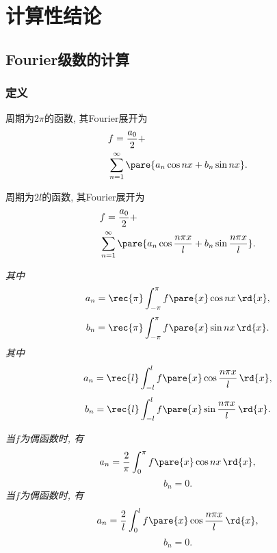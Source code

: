 \documentclass[hidelinks]{ctexart}
\begin{document}



\section{计算性结论} %
\label{sec:计算性结论}

\subsection{Fourier级数的计算} %
\label{sub:fourier级数的计算}

\subsubsection{定义} %
\label{ssub:定义}

\begin{finale}

\begin{multicols}{2}
    \begin{theorem}
        周期为$2\pi$的函数, 其Fourier展开为
        \begin{align*}
            &f = \frac{a_0}{2} +\\
            &\sum_{n=1}^\infty \pare{a_n\cos nx + b_n\sin nx}.
        \end{align*}
    \end{theorem}
    \begin{theorem}
        周期为$2l$的函数, 其Fourier展开为
        \begin{align*}
            &f = \frac{a_0}{2} +\\
            &\sum_{n=1}^\infty \pare{a_n\cos \frac{n\pi x}{l} + b_n\sin \frac{n\pi x}{l}}.
        \end{align*}
    \end{theorem}
\end{multicols}

\end{finale}
\begin{finale}
\begin{multicols}{2}
    \textit{其中}
    \[ a_n = \rec{\pi} \int_{-\pi}^{\pi} f\pare{x}\cos nx\,\rd{x},\]
    \[ b_n = \rec{\pi} \int_{-\pi}^\pi f\pare{x}\sin nx\,\rd{x}. \]
    \textit{其中}
    \[ a_n = \rec{l} \int_{-l}^{l} f\pare{x}\cos \frac{n\pi x}{l}\,\rd{x},\]
    \[ b_n = \rec{l} \int_{-l}^{l} f\pare{x}\sin \frac{n\pi x}{l}\,\rd{x}. \]
\end{multicols}
\end{finale}
\begin{finale}
\begin{multicols}{2}
    \textit{当$f$为偶函数时, 有}
    \[ a_n = \frac{2}{\pi} \int_{0}^{\pi} f\pare{x}\cos nx\,\rd{x},\]
    \[ b_n = 0. \]
    \textit{当$f$为偶函数时, 有}
    \[ a_n = \frac{2}{l} \int_{0}^{l} f\pare{x}\cos \frac{n\pi x}{l}\,\rd{x},\]
    \[ b_n = 0. \]
\end{multicols}
\end{finale}
\end{document}
